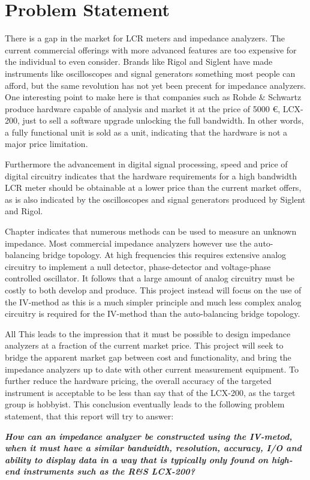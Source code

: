 \chapter{Problem Statement} \label{ch:ProblemStatement}
There is a gap in the market for LCR meters and impedance analyzers. The current commercial offerings with more advanced features are too expensive for the individual to even consider. Brands like Rigol and Siglent have made instruments like oscilloscopes and signal generators something most people can afford, but the same revolution has not yet been precent for impedance analyzers. One interesting point to make here is that companies such as Rohde \& Schwartz produce hardware capable of  analysis and market it at the price of 5000 €, LCX-200, just to sell a software upgrade unlocking the full  bandwidth. In other words, a fully functional  unit is sold as a  unit, indicating that the hardware is not a major price limitation. 

Furthermore the advancement in digital signal processing, speed and price of digital circuitry indicates that the hardware requirements for a high bandwidth LCR meter should be obtainable at a lower price than the current market offers, as is also indicated by the oscilloscopes and signal generators produced by Siglent and Rigol.

Chapter  indicates that numerous methods can be used to measure an unknown impedance. Most commercial impedance analyzers however use the auto-balancing bridge topology. At high frequencies this requires extensive analog circuitry to implement a null detector, phase-detector and voltage-phase controlled oscillator. It follows that a large amount of analog circuitry must be costly to both develop and produce. This project instead will focus on the use of the IV-method as this is a much simpler principle and much less complex analog circuitry is required for the IV-method than the auto-balancing bridge topology.

All This leads to the impression that it must be possible to design impedance analyzers at a fraction of the current market price. This project will seek to bridge the apparent market gap between cost and functionality, and bring the impedance analyzers up to date with other current measurement equipment. To further reduce the hardware pricing, the overall accuracy of the targeted instrument is acceptable to be less than say that of the LCX-200, as the target group is hobbyist. This conclusion eventually leads to the following problem statement,
that this report will try to answer:

\textbf{\textit{How can an impedance analyzer be constructed using the IV-metod, when it must have a similar bandwidth, resolution, accuracy, I/O and ability to display data in a way that is typically only found on high-end instruments such as the R\&S LCX-200?}}